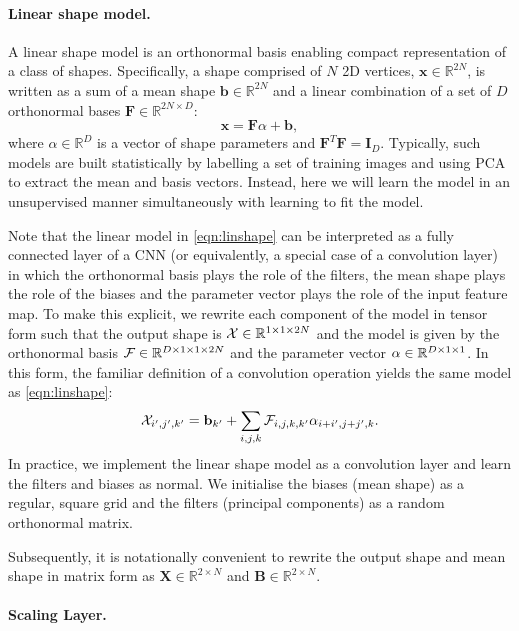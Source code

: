 \documentclass[runningheads]{llncs}
\newcommand{\R}{\mathbb{R}}
\begin{document}
\paragraph{Linear shape model.}
A linear shape model is an orthonormal basis enabling compact representation of a class of shapes. Specifically, a shape comprised of $N$ 2D vertices, $\mathbf{x}\in\R^{2N}$, is written as a sum of a mean shape $\mathbf{b}\in\R^{2N}$ and a linear combination of a set of $D$ orthonormal bases $\mathbf{F}\in\R^{2N\times D}$:
\begin{equation}
    \mathbf{x} = \mathbf{F}\alpha + \mathbf{b},\label{eqn:linshape}
\end{equation}
where $\alpha\in\R^D$ is a vector of shape parameters and $\mathbf{F}^T\mathbf{F}=\mathbf{I}_D$. Typically, such models are built statistically by labelling a set of training images and using PCA to extract the mean and basis vectors. Instead, here we will learn the model in an unsupervised manner simultaneously with learning to fit the model.

Note that the linear model in \eqref{eqn:linshape} can be interpreted as a fully connected layer of a CNN (or equivalently, a special case of a convolution layer) in which the orthonormal basis plays the role of the filters, the mean shape plays the role of the biases and the parameter vector plays the role of the input feature map. To make this explicit, we rewrite each component of the model in tensor form such that the output shape is ${\cal X}\in\R^{1\times 1\times 2N}$ and the model is given by the orthonormal basis ${\cal F}\in\R^{D\times 1\times 1\times 2N}$ and the parameter vector ${\cal \alpha}\in\R^{D\times 1 \times 1}$. In this form, the familiar definition of a convolution operation yields the same model as \eqref{eqn:linshape}:
\begin{equation}{\cal X}_{i^{\prime},j^{\prime},k^{\prime}}=\mathbf{b}_{k^{\prime}} + \sum_{i,j,k} {\cal F}_{i,j,k,k^{\prime}}\alpha_{i+i^{\prime},j+j^{\prime},k}.
\end{equation}
In practice, we implement the linear shape model as a convolution layer and learn the filters and biases as normal. We initialise the biases (mean shape) as a regular, square grid and the filters (principal components) as a random orthonormal matrix.

Subsequently, it is notationally convenient to rewrite the output shape and mean shape in matrix form as $\mathbf{X}\in\R^{2\times N}$ and  $\mathbf{B}\in\R^{2\times N}$.

\paragraph{Scaling Layer.}
\end{document}
